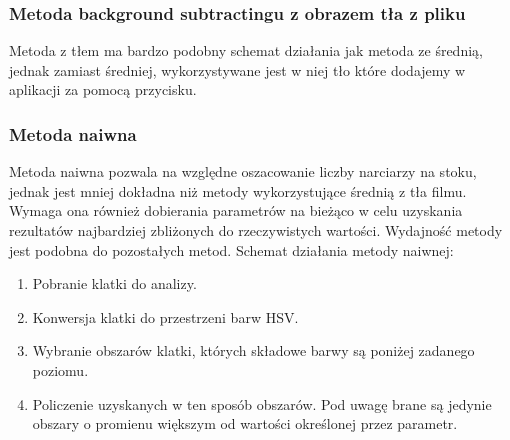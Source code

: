 \documentclass[a4paper]{article}
\begin{document}
\subsubsection{Metoda background subtractingu z obrazem tła z pliku}
Metoda z tłem ma bardzo podobny schemat działania jak metoda ze średnią, jednak zamiast średniej, wykorzystywane jest w niej tło które dodajemy w aplikacji za pomocą przycisku.

\subsubsection{Metoda naiwna}
Metoda naiwna pozwala na względne oszacowanie liczby narciarzy na stoku, jednak jest mniej dokładna niż metody wykorzystujące średnią z tła filmu. Wymaga ona również dobierania parametrów na bieżąco w celu uzyskania rezultatów najbardziej zbliżonych do rzeczywistych wartości. Wydajność metody jest podobna do pozostałych metod. Schemat działania metody naiwnej:
\begin{enumerate}
\item Pobranie klatki do analizy.
\item Konwersja klatki do przestrzeni barw HSV.
\item Wybranie obszarów klatki, których składowe barwy są poniżej zadanego poziomu.
\item Policzenie uzyskanych w ten sposób obszarów. Pod uwagę brane są jedynie obszary o promienu większym od wartości określonej przez parametr.
\end{enumerate}
\end{document}
